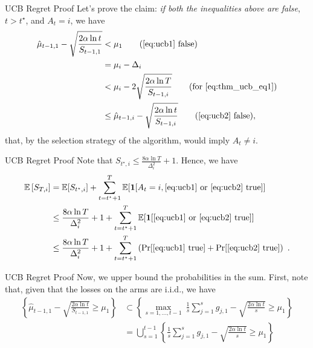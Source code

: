 \documentclass{beamer}
\begin{document}
\begin{frame}{UCB Regret Proof}
Let's prove the claim: \emph{if both the inequalities above are false}, $t> t^\star$, and $A_t = i$, we have
\begin{align*}
\hat{\mu}_{t-1,1} - \sqrt{\frac{2\alpha \ln t}{S_{t-1,1}}} 
&< \mu_1 \qquad (\eqref{eq:ucb1} \text{ false}) \\
&= \mu_i - \Delta_i \\
&< \mu_i - 2\sqrt{\frac{2\alpha \ln T}{S_{t-1,i}}} \qquad (\text{for } \eqref{eq:thm_ucb_eq1})\\
&\leq \hat{\mu}_{t-1,i} - \sqrt{\frac{2 \alpha \ln t}{S_{t-1,i}}} \qquad (\eqref{eq:ucb2} \text{ false}),
\end{align*}
that, by the selection strategy of the algorithm, would imply $A_t \neq i$.

\end{frame}

\begin{frame}{UCB Regret Proof}
Note that $S_{t^\star,i} \leq \frac{8\alpha \ln T}{\Delta_i^2}+1$. Hence, we have
\begin{align*}
\mathbb{E}\left[ S_{T,i}\right]
&= \mathbb{E}[S_{t^\star,i}] + \sum_{t=t^\star+1}^T \mathbb{E}[\boldsymbol{1}[A_t=i, \eqref{eq:ucb1} \text{ or } \eqref{eq:ucb2} \text{ true}]] \\
&\leq \frac{8\alpha \ln T}{\Delta_i^2} + 1 + \sum_{t=t^\star+1}^T \mathbb{E}[\boldsymbol{1}[\eqref{eq:ucb1} \text{ or } \eqref{eq:ucb2} \text{ true}]] \\
&\leq  \frac{8\alpha \ln T}{\Delta_i^2} + 1 + \sum_{t=t^\star+1}^T \left(\Pr[\eqref{eq:ucb1} \text{ true}] + \Pr[\eqref{eq:ucb2} \text{ true}]\right)~.
\end{align*}

\end{frame}


\begin{frame}{UCB Regret Proof}
Now, we upper bound the probabilities in the sum. First, note that, given that the losses on the arms are i.i.d., we have
\begin{align*}
\left\{\hat{\mu}_{t-1,1} - \sqrt{\frac{2\alpha \ln t}{S_{t-1,1}}} \geq \mu_1 \right\}
&\subset \left\{\max_{s=1, \dots, t-1} \ \frac{1}{s}\sum_{j=1}^s g_{j,1} - \sqrt{\frac{2\alpha \ln t}{s}} \geq \mu_1\right\}\\
&= \bigcup_{s=1}^{t-1} \left\{\frac{1}{s}\sum_{j=1}^s g_{j,1} - \sqrt{\frac{2\alpha \ln t}{s}} \geq \mu_1\right\}
\end{align*}
\end{frame}
\end{document}

